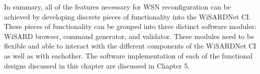In summary, all of the features necessary for WSN reconfiguration can be achieved by developing discrete pieces of functionality into the WiSARDNet CI. These pieces of functionality can be grouped into three distinct software modules: WiSARD browser, command generator, and validator. These modules need to be flexible and able to interact with the different components of the WiSARDNet CI as well as with eachother. The software implementation of each of the functional designs discussed in this chapter are discussed in Chapter 5.





















